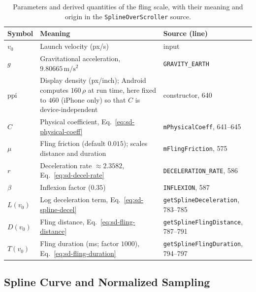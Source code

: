 \documentclass[12pt,a4paper]{report}
\begin{document}
        \begin{table}[htbp]
        \centering
        \begin{tabular}{l p{6cm} p{4.3cm}}
        \hline
        Symbol & Meaning & Source (line) \\
        \hline
        $v_0$ & Launch velocity (px/s) & input \\
        $g$ & Gravitational acceleration, $9.80665\,\mathrm{m/s^2}$ & \texttt{GRAVITY\_EARTH} \\
        $\mathrm{ppi}$ & Display density (px/inch); Android computes $160\,\rho$ at run time, here fixed to $460$ (iPhone only) so that $C$ is device-independent & constructor, 640 \\
        $C$ & Physical coefficient, Eq.~\eqref{eq:sd-physical-coeff} & \texttt{mPhysicalCoeff}, 641--645 \\
        $\mu$ & Fling friction (default $0.015$); scales distance and duration & \texttt{mFlingFriction}, 575 \\
        $r$ & Deceleration rate $\approx 2.3582$, Eq.~\eqref{eq:sd-decel-rate} & \texttt{DECELERATION\_RATE}, 586 \\
        $\beta$ & Inflexion factor ($0.35$) & \texttt{INFLEXION}, 587 \\
        $L(v_0)$ & Log deceleration term, Eq.~\eqref{eq:sd-spline-decel} & \texttt{getSplineDeceleration}, 783--785 \\
        $D(v_0)$ & Fling distance, Eq.~\eqref{eq:sd-fling-distance} & \texttt{getSplineFlingDistance}, 787--791 \\
        $T(v_0)$ & Fling duration (ms; factor $1000$), Eq.~\eqref{eq:sd-fling-duration} & \texttt{getSplineFlingDuration}, 794--797 \\
        \hline
        \end{tabular}
        \caption{Parameters and derived quantities of the fling scale, with their meaning and origin in the \texttt{SplineOverScroller} source.}
        \label{tab:scale-params}
        \end{table}

        \subsection{Spline Curve and Normalized Sampling}
\end{document}
